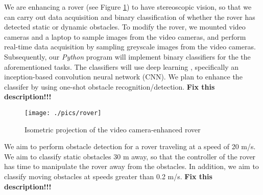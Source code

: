 \documentclass[letter,12pt]{article}
\begin{document}
We are enhancing a rover (see Figure \ref{fig:Isometricprojectionofthevideocameraenhancedrover}) to have stereoscopic vision, so that we can carry out data acquisition and binary classification of whether the rover has detected static or dynamic obstacles. To modify the rover, we mounted video cameras and a laptop to sample images from the video cameras, and perform real-time data acquisition by sampling greyscale images from the video cameras. Subsequently, our {\it Python} program will implement binary classifiers for the the aforementioned tasks. The classifiers will use deep learning \cite{Buduma2017,Ketkar2017,Pattanayak2017,Goodfellow2016,Wang2016,Bengio2015,Cho2014,Goodfellow2014}, specifically an inception-based convolution neural network (CNN). We plan to enhance the classifer by using one-shot obstacle recognition/detection. {\Huge \bf Fix this description!!!}


\begin{figure}[h]
\centering 
\texttt{[image: ./pics/rover]}
\caption{Isometric projection of the video camera-enhanced rover}
\label{fig:Isometricprojectionofthevideocameraenhancedrover}
\end{figure}


We aim to perform obstacle detection for a rover traveling at a speed of 20 m/s. We aim to classify static obstacles 30 m away, so that the controller of the rover has time to manipulate the rover away from the obstacles. In addition, we aim to classify moving obstacles at speeds greater than 0.2 m/s. {\Huge \bf Fix this description!!!}


\end{document}
